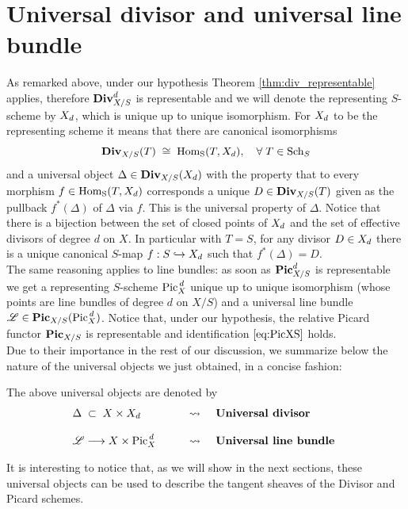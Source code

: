 \section{Universal divisor and universal line bundle}
	As remarked above, under our hypothesis Theorem \ref{thm:div_representable} applies, therefore $\operatorname{\mathbf{Div}}_{X/S}^d$ is representable and we will denote the representing $S$-scheme by $X_d$, which is unique up to unique isomorphism. For $X_d$ to be the representing scheme it means that there are canonical isomorphisms
	$$ \operatorname{\mathbf{Div}}_{X/S}(T) \;\cong\; \operatorname{Hom_S}(T,X_d), \quad \forall \;T\in \operatorname{Sch}_S $$
	and a universal object $\Delta \in \operatorname{\mathbf{Div}}_{X/S}(X_d)$ with the property that to every morphism $f\in \operatorname{Hom_S}(T,X_d)$ corresponds a unique $D\in \operatorname{\mathbf{Div}}_{X/S}(T)$ given as the pullback $f^*(\Delta)$ of $\Delta$ via $f$. This is the universal property of $\Delta$. 
	Notice that there is a bijection between the set of closed points of $X_d$ and the set of effective divisors of degree $d$ on $X$. In particular with $T=S$, for any divisor $D\in X_d$ there is a unique canonical $S$-map $f:S\hookrightarrow X_d$ such that $f^*(\Delta) = D$.\\

	The same reasoning applies to line bundles: as soon as $\operatorname{\mathbf{Pic}}_{X/S}^d$ is representable we get a representing $S$-scheme $\operatorname{Pic}^{\,d}_X$ unique up to unique isomorphism (whose points are line bundles of degree $d$ on $X/S$) and a universal line bundle $\mathscr{L} \in \operatorname{\mathbf{Pic}}_{X/S}(\operatorname{Pic}^{\,d}_X)$. Notice that, under our hypothesis, the relative Picard functor $\operatorname{\mathbf{Pic}}_{X/S}$ is representable and identification $\eqref{eq:PicXS}$ holds.\\

	Due to their importance in the rest of our discussion, we summarize below the nature of the universal objects we just obtained, in a concise fashion: 
	\begin{notation}
		The above universal objects are denoted by
		$$
			\begin{array}{ l c l }
				\Delta\;\subset\; X\times X_d \qquad &\leadsto& \textbf{ Universal divisor }
				\\\\
				\mathscr{L} \longrightarrow X\times \operatorname{Pic}^{\,d}_X \qquad &\leadsto& \textbf{ Universal line bundle }
			\end{array}
		$$
	\end{notation}\vspace{1em}
	It is interesting to notice that, as we will show in the next sections, these universal objects can be used to describe the tangent sheaves of the Divisor and Picard schemes.\vspace{1em}

